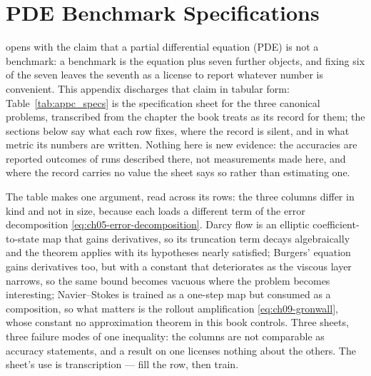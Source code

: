 
\chapter{PDE Benchmark Specifications}\label{app:c}

 opens with the claim that
a partial differential equation (PDE) is not a benchmark: a benchmark is the equation
plus seven further objects, and fixing six of the seven leaves the seventh as a license
to report whatever number is convenient. This appendix discharges that claim in tabular
form: Table~\ref{tab:appc_specs} is the specification sheet for the three
canonical problems, transcribed from the chapter the book treats as its record for them;
the sections below say what each row fixes, where the record is silent, and in what metric
its numbers are written. Nothing here is new evidence: the accuracies are reported outcomes
of runs described there, not measurements made here, and where the record carries no value
the sheet says so rather than estimating one.

The table makes one argument, read across its rows: the three columns differ in kind and
not in size, because each loads a different term of the error decomposition
\eqref{eq:ch05-error-decomposition}. Darcy flow is an elliptic coefficient-to-state map that
gains derivatives, so its truncation term decays algebraically and the theorem applies with
its hypotheses nearly satisfied; Burgers' equation gains derivatives too, but with a
constant that deteriorates as the viscous layer narrows, so the same bound becomes vacuous
where the problem becomes interesting; Navier--Stokes is trained as a one-step map but
consumed as a composition, so what matters is the rollout amplification
\eqref{eq:ch09-gronwall}, whose constant no approximation theorem in this book controls.
Three sheets, three failure modes of one inequality: the columns are not comparable as
accuracy statements, and a result on one licenses nothing about the others. The sheet's use
is transcription --- fill the row, then train.

